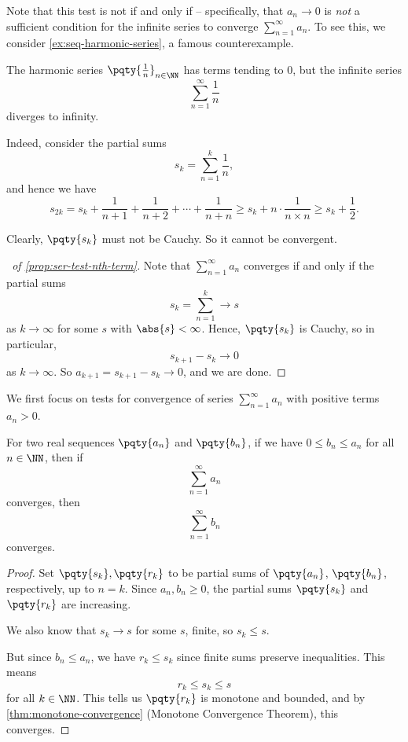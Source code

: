 \begin{remark}
    Note that this test is not if and only if -- specifically, that \(a_n \to 0\) is \emph{not} a sufficient condition for the infinite series to converge \(\sum_{n = 1}^{\infty} a_n\). To see this, we consider \autoref{ex:seq-harmonic-series}, a famous counterexample.
\end{remark}

\begin{example}
    \label{ex:seq-harmonic-series}%
    The harmonic series \(\pqty{\frac{1}{n}}_{n \in \NN}\) has terms tending to \(0\), but the infinite series
    \[
        \sum_{n = 1}^{\infty} \frac{1}{n}
    \]
    diverges to infinity.

    Indeed, consider the partial sums
    \[
        s_k = \sum_{n = 1}^{k} \frac{1}{n},
    \]
    and hence we have
    \[
        s_{2k} = s_k + \frac{1}{n + 1} + \frac{1}{n + 2} + \cdots + \frac{1}{n + n} \geq s_k + n \cdot \frac{1}{n \times n} \geq s_k + \frac{1}{2}.
    \]

    Clearly, \(\pqty{s_k}\) must not be Cauchy. So it cannot be convergent.
\end{example}

\begin{proof}[\proofname\ of \autoref{prop:ser-test-nth-term}]
    Note that \(\sum_{n = 1}^{\infty} a_n\) converges if and only if the partial sums
    \[
        s_k = \sum_{n = 1}^{k} \to s
    \]
    as \(k \to \infty\) for some \(s\) with \(\abs{s} < \infty\). Hence, \(\pqty{s_k}\) is Cauchy, so in particular,
    \[
        s_{k + 1} - s_k \to 0
    \]
    as \(k \to \infty\). So \(a_{k + 1} = s_{k + 1} - s_k \to 0\), and we are done.
\end{proof}

We first focus on tests for convergence of series \(\sum_{n = 1}^{\infty} a_n\) with positive terms \(a_n > 0\).

\begin{proposition}
    \label{prop:ser-test-comparison}%
    For two real sequences \(\pqty{a_n}\) and \(\pqty{b_n}\), if we have \(0 \leq b_n \leq a_n\) for all \(n \in \NN\), then if
    \[
        \sum_{n = 1}^{\infty} a_n
    \]
    converges, then
    \[
        \sum_{n = 1}^{\infty} b_n
    \]
    converges.
\end{proposition}

\begin{proof}
    Set \(\pqty{s_k}, \pqty{r_k}\) to be partial sums of \(\pqty{a_n}\), \(\pqty{b_n}\), respectively, up to \(n = k\). Since \(a_n, b_n \geq 0\), the partial sums \(\pqty{s_k}\) and \(\pqty{r_k}\) are increasing.

    We also know that \(s_k \to s\) for some \(s\), finite, so \(s_k \leq s\).

    But since \(b_n \leq a_n\), we have \(r_k \leq s_k\) since finite sums preserve inequalities. This means
    \[
        r_k \leq s_k \leq s
    \]
    for all \(k \in \NN\). This tells us \(\pqty{r_k}\) is monotone and bounded, and by \autoref{thm:monotone-convergence} (Monotone Convergence Theorem), this converges.
\end{proof}

